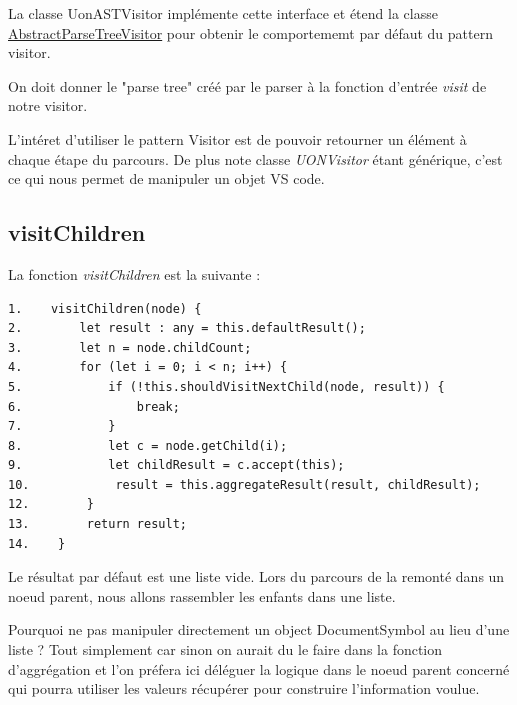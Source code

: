 \documentclass[
    iict, %
    il, %
]{heig-tb}
\begin{document}

La classe UonASTVisitor implémente cette interface et étend la classe \href{https://www.antlr.org/api/Java/org/antlr/v4/runtime/tree/AbstractParseTreeVisitor.html}{AbstractParseTreeVisitor}
pour obtenir le comportememt par défaut du pattern visitor.

On doit donner le "parse tree" créé par le parser à la fonction d'entrée \emph{visit} de notre visitor. %

L'intéret d'utiliser le pattern Visitor est de pouvoir retourner un élément à chaque étape du parcours.
De plus note classe \emph{UONVisitor} étant générique, c'est ce qui nous permet de manipuler un objet VS code.



\subsection{visitChildren}

La fonction \emph{visitChildren} est la suivante :

\begin{lstlisting}
1.    visitChildren(node) {
2.        let result : any = this.defaultResult();
3.        let n = node.childCount;
4.        for (let i = 0; i < n; i++) {
5.            if (!this.shouldVisitNextChild(node, result)) {
6.                break;
7.            }
8.            let c = node.getChild(i);
9.            let childResult = c.accept(this);
10.            result = this.aggregateResult(result, childResult);
12.        }
13.        return result;
14.    }
\end{lstlisting}

Le résultat par défaut est une liste vide. Lors du parcours de la remonté dans un noeud parent, nous allons rassembler les enfants dans une liste.

Pourquoi ne pas manipuler directement un object DocumentSymbol au lieu d'une liste ?
Tout simplement car sinon on aurait du le faire dans la fonction d'aggrégation et l'on préfera ici déléguer la logique dans le noeud parent concerné
qui pourra utiliser les valeurs récupérer pour construire l'information voulue.
\end{document}
